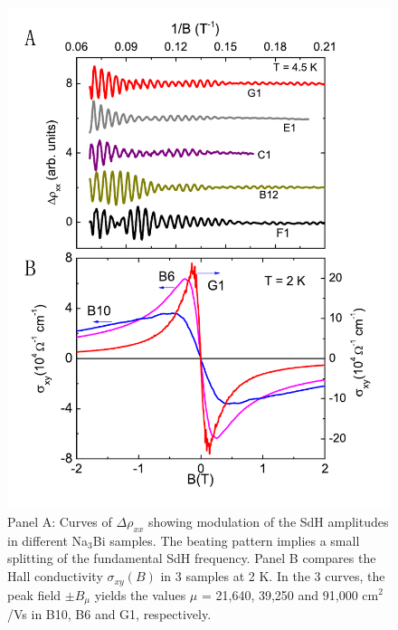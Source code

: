 \begin{figure}[!htbp]
  \begin{center}
\includegraphics[width=0.9\linewidth]{ch-na3bi/figures/FigBeatsDrude.pdf}
\caption{\label{figBeats} 
Panel A: Curves of $\Delta\rho_{xx}$ showing modulation of the SdH amplitudes in different Na$_3$Bi samples. The beating pattern implies a small splitting of the fundamental SdH frequency.
Panel B compares the Hall conductivity $\sigma_{xy}(B)$ in 3 samples at 2 K. In the 3 curves, the peak field $\pm B_{\mu}$ yields the values $\mu$ = 21,640, 39,250 and 91,000 cm$^2$/Vs in B10, B6 and G1, respectively.
}
  \end{center}
\end{figure}

